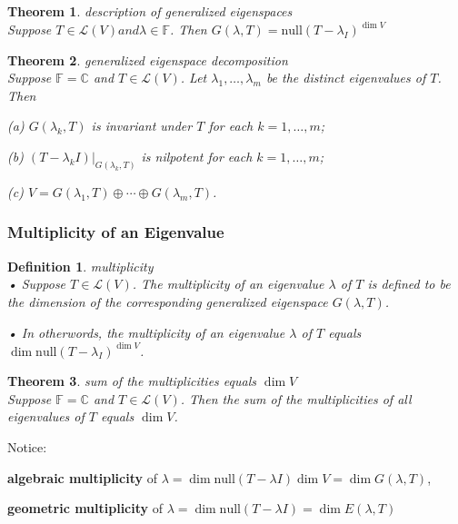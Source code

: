 \documentclass{article}
\newtheorem{theorem}{Theorem}[subsection]
\newtheorem{definition}{Definition}[subsection]
\newcommand{\CC}{\mathbb{C}}
\newcommand{\FF}{\mathbb{F}}
\newcommand{\n}{\text{null}}
\begin{document}
\begin{CJK}{UTF8}{gkai}
\begin{theorem}
    description of generalized eigenspaces\\

    Suppose $T \in \mathcal{L}(V) and \lambda \in \FF$. Then $G(\lambda,T) = \n (T - \lambda_I)^{\dim V}$
\end{theorem}

\begin{theorem}
    generalized eigenspace decomposition\\

    Suppose $\FF = \CC$ and $T \in \mathcal{L}(V)$. Let $\lambda_1,\ldots,\lambda_m$ be the distinct eigenvalues of $T$. Then

    (a) $G(\lambda_k,T)$ is invariant under $T$ for each $k = 1,\ldots,m$;

    (b) $(T - \lambda_kI)|_{G(\lambda_k,T)}$ is nilpotent for each $k = 1,\ldots,m$;

    (c) $V = G(\lambda_1,T)\oplus\cdots\oplus G(\lambda_m,T)$.
\end{theorem}

\subsubsection{Multiplicity of an Eigenvalue}

\begin{definition}
    multiplicity\\

    • Suppose $T \in \mathcal{L}(V)$. The multiplicity of an eigenvalue $\lambda$ of $T$ is defined to be the dimension of the corresponding generalized eigenspace $G(\lambda,T)$.

    • In otherwords, the multiplicity of an eigenvalue $\lambda$ of $T$ equals $\dim \n (T-\lambda_I)^{\dim V}$.
\end{definition}

\begin{theorem}
    sum of the multiplicities equals $\dim V$\\

    Suppose $\FF = \CC$ and $T \in \mathcal{L}(V)$. Then the sum of the multiplicities of all eigenvalues of $T$ equals $\dim V$.
\end{theorem}

Notice:

\textbf{algebraic multiplicity} of $\lambda = \dim \n (T - \lambda I)\dim V = \dim G (\lambda,T)$,

\textbf{geometric multiplicity} of $\lambda = \dim \n (T - \lambda I) = \dim E(\lambda,T)$


\end{CJK}
\end{document}
